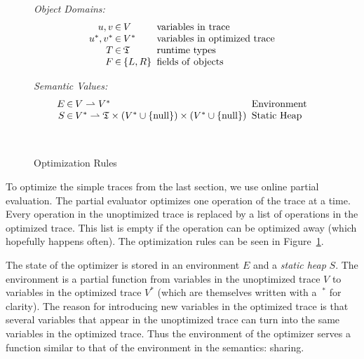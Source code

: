 \documentclass[preprint]{sigplanconf}
\begin{document}
\begin{figure}
\begin{center}
\begin{minipage}[b]{7 cm}
\emph{Object Domains:}
$$\setlength\arraycolsep{0.1em}
 \begin{array}{rcll}
    u,v & \in & V & \mathrm{\ variables\ in\ trace}\\
    u^*,v^* & \in & V^* & \mathrm{\ variables\ in\ optimized\ trace}\\
    T & \in & \mathfrak{T} & \mathrm{\ runtime\ types}\\
    F & \in & \left\{ L,R\right\} & \mathrm{\ fields\ of\ objects}\\
 \end{array}
$$
\end{minipage}
\begin{minipage}[b]{5 cm}
\emph{Semantic Values:}
$$\setlength\arraycolsep{0.1em}
 \begin{array}{rcll}
    E & \in & V\rightharpoonup V^* & \mathrm{\ Environment}\\
    S & \in & V^*\rightharpoonup\mathfrak{T}\times(V^*\cup \{ \mathrm{null} \})\times (V^*\cup \{ \mathrm{null}\} ) & \mathrm{\ Static\ Heap}\\
    \\
    \\
 \end{array}
$$
\end{minipage}
\end{center}
\caption{Optimization Rules}
\label{fig:optimization}
\end{figure}

To optimize the simple traces from the last section, we use online partial
evaluation. The partial evaluator optimizes one operation of the trace at a
time. Every operation in the unoptimized trace is replaced by a list of
operations in the optimized trace. This list is empty if the operation
can be optimized away (which hopefully happens often). The optimization rules
can be seen in Figure~\ref{fig:optimization}.

The state of the optimizer is stored in an environment $E$ and a \emph{static
heap} $S$. The environment is a partial function from variables in the
unoptimized trace $V$ to variables in the optimized trace $V^*$ (which are
themselves written with a
$\ ^*$ for clarity). The reason for introducing new variables in the optimized
trace is that several variables that appear in the unoptimized trace can turn
into the same variables in the optimized trace. Thus the environment of the
optimizer serves a function similar to that of the environment in the semantics: sharing.
\end{document}
